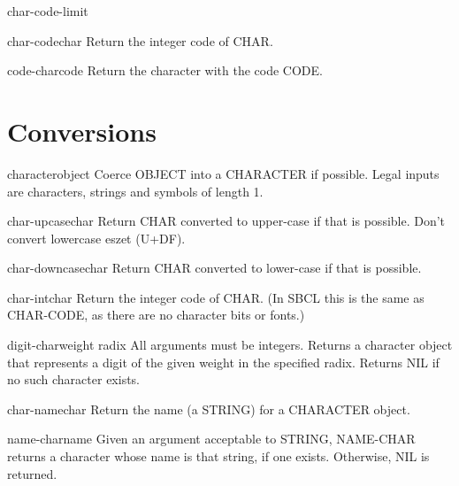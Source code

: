 \documentclass[10pt,english]{book}
\begin{document}
\begin{constant}{char-code-limit}{}
  
\end{constant}

\begin{function}{char-code}{char}
  Return the integer code of CHAR.
\end{function}

\begin{function}{code-char}{code}
  Return the character with the code CODE.
\end{function}

\section{Conversions}
\label{sec:character-conversions}

\begin{function}{character}{object}
  Coerce OBJECT into a CHARACTER if possible. Legal inputs are
  characters, strings and symbols of length 1.
\end{function}

\begin{function}{char-upcase}{char}
  Return CHAR converted to upper-case if that is possible.  Don't convert
   lowercase eszet (U+DF).
\end{function}

\begin{function}{char-downcase}{char}
  Return CHAR converted to lower-case if that is possible.
\end{function}

\begin{function}{char-int}{char}
  Return the integer code of CHAR. (In SBCL this is the same as CHAR-CODE, as
   there are no character bits or fonts.)
\end{function}

\begin{function}{digit-char}{weight \op radix}
  All arguments must be integers. Returns a character object that
  represents a digit of the given weight in the specified radix. Returns
  NIL if no such character exists.
\end{function}

\begin{function}{char-name}{char}
  Return the name (a STRING) for a CHARACTER object.
\end{function}

\begin{function}{name-char}{name}
  Given an argument acceptable to STRING, NAME-CHAR returns a character
  whose name is that string, if one exists. Otherwise, NIL is returned.
\end{function}
\end{document}
